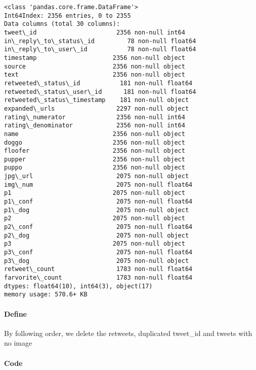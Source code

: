 \documentclass[11pt]{article}
\begin{document}
    \begin{Verbatim}[commandchars=\\\{\}]
<class 'pandas.core.frame.DataFrame'>
Int64Index: 2356 entries, 0 to 2355
Data columns (total 30 columns):
tweet\_id                      2356 non-null int64
in\_reply\_to\_status\_id         78 non-null float64
in\_reply\_to\_user\_id           78 non-null float64
timestamp                     2356 non-null object
source                        2356 non-null object
text                          2356 non-null object
retweeted\_status\_id           181 non-null float64
retweeted\_status\_user\_id      181 non-null float64
retweeted\_status\_timestamp    181 non-null object
expanded\_urls                 2297 non-null object
rating\_numerator              2356 non-null int64
rating\_denominator            2356 non-null int64
name                          2356 non-null object
doggo                         2356 non-null object
floofer                       2356 non-null object
pupper                        2356 non-null object
puppo                         2356 non-null object
jpg\_url                       2075 non-null object
img\_num                       2075 non-null float64
p1                            2075 non-null object
p1\_conf                       2075 non-null float64
p1\_dog                        2075 non-null object
p2                            2075 non-null object
p2\_conf                       2075 non-null float64
p2\_dog                        2075 non-null object
p3                            2075 non-null object
p3\_conf                       2075 non-null float64
p3\_dog                        2075 non-null object
retweet\_count                 1783 non-null float64
farvorite\_count               1783 non-null float64
dtypes: float64(10), int64(3), object(17)
memory usage: 570.6+ KB

    \end{Verbatim}

    \hypertarget{define}{%
\paragraph{Define}\label{define}}

By following order, we delete the retweets, duplicated tweet\_id and
tweets with no image

    \hypertarget{code}{%
\paragraph{Code}\label{code}}
\end{document}
